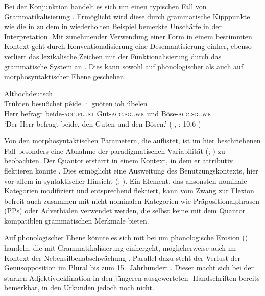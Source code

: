 Bei der Konjunktion  handelt es sich um einen typischen Fall von
Grammatikalisierung \autocite[vgl.][134--188]{lehmann2015}. Ermöglicht wird
diese durch grammatische Kipppunkte wie die in  zu dem
in  wiederholten Beispiel bemerkte Unschärfe in der
Interpretation. Mit zunehmender Verwendung einer Form in einem bestimmten
Kontext geht durch Konventionalisierung eine Desemantisierung einher, ebenso
verliert das lexikalische Zeichen mit der Funktionalisierung durch das
grammatische System an . Dies kann sowohl auf phonologischer als
auch auf morphosyntaktischer Ebene geschehen.

\begin{exe}
\ex \label{ex:beidejohahd_2_copy}
	\langinfo%
		{Althochdeutsch}%
		{}%
		{\cite[35]{tax1979}}\\
	\gll Trúhten besuôchet pêide · guôten ioh úbelen \\
			Herr befragt beide-\textsc{acc.pl.\MascA.st} {}
				Gut-\textsc{acc.sg.\MascA.wk} und
				Böse-\textsc{acc.sg.\MascA.wk} \\
		\trans `Der Herr befragt beide, den Guten und den Bösen.'
			(%
				, : 10,6
			)
\end{exe}

Von den morphosyntaktischen Parametern, die \citet[174]{lehmann2015} auflistet,
ist im hier beschriebenen Fall besonders eine Abnahme der paradigmatischen
Variabilität (; \cite[146--150]{lehmann2015}) zu
beobachten. Der Quantor erstarrt in einem Kontext, in dem er attributiv
flektieren könnte . Dies ermöglicht eine Ausweitung des
Benutzungskontexts, hier vor allem in syntaktischer Hinsicht (; \cite[150--151]{lehmann2015}). Ein Element, das
ansonsten nominale Kategorien modifiziert und entsprechend flektiert, kann vom
Zwang zur Flexion befreit auch zusammen mit nicht-nominalen Kategorien wie
Präpositionalphrasen (PPs) oder Adverbialen verwendet werden, die selbst keine
mit dem Quantor kompatiblen grammatischen Merkmale bieten.

Auf phonologischer Ebene könnte es sich mit \citet[134--136]{lehmann2015} bei
 um phonologische Erosion () handeln,
die mit Grammatikalisierung einhergeht, möglicherweise auch im Kontext der
Nebensilbenabschwächung \autocite[88--92]{braune2018}. Parallel dazu steht der
Verlust der Genusopposition im Plural bis zum 15.~Jahrhundert
\autocites[203]{paul2007}[191--192]{reichmannwegera1993}. Dieser macht sich bei
der starken Adjektivdeklination in den jüngeren ausgewerteten
\KC{}-Handschriften bereits bemerkbar, in den Urkunden jedoch noch nicht.

